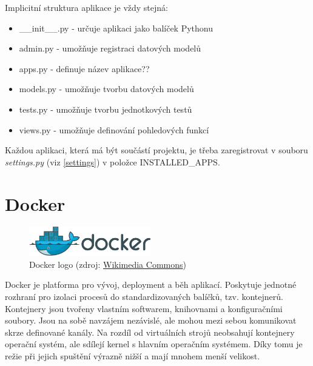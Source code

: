 Implicitní struktura aplikace je vždy stejná:

\begin{itemize}
\item \textsf{\_\_init\_\_.py} - určuje aplikaci jako balíček Pythonu
\item \textsf{admin.py} - umožňuje registraci datových modelů
\item \textsf{apps.py} - definuje název aplikace??
\item \textsf{models.py} - umožňuje tvorbu datových modelů
\item \textsf{tests.py} - umožňuje tvorbu jednotkových testů
\item \textsf{views.py} - umožňuje definování pohledových funkcí
\end{itemize}

Každou aplikaci, která má být součástí projektu, je třeba
zaregistrovat v souboru \textit{settings.py} (viz \ref{settings}) v
položce \textsf{INSTALLED\_APPS}.

\section{Docker}
\label{docker}

\begin{figure}[H] \centering
      \includegraphics[width=150pt]{./pictures/Docker_(container_engine)_logo.png}
      \caption[Docker logo]{Docker logo (zdroj:
\href{https://commons.wikimedia.org/wiki/File:Docker_(container_engine)_logo.png}{Wikimedia Commons})}
      \label{fig:docker}
  \end{figure}
  
Docker je platforma pro vývoj, deployment a běh aplikací. Poskytuje
jednotné rozhraní pro izolaci procesů do standardizovaných balíčků,
tzv. kontejnerů. Kontejnery jsou tvořeny vlastním softwarem,
knihovnami a konfiguračními soubory. Jsou na sobě navzájem nezávislé,
ale mohou mezi sebou komunikovat skrze definované kanály. Na rozdíl od
virtuálních strojů neobsahují kontejnery operační systém, ale sdílejí
kernel s hlavním operačním systémem. Díky tomu je režie při jejich
spuštění výrazně nižší a mají mnohem menší velikost.

